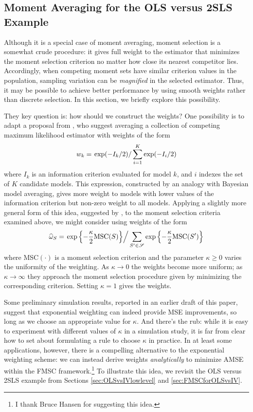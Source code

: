 \subsection{Moment Averaging for the OLS versus 2SLS Example}
Although it is a special case of moment averaging, moment selection is a somewhat crude procedure: it gives full weight to the estimator that minimizes the moment selection criterion no matter how close its nearest competitor lies. 
Accordingly, when competing moment sets have similar criterion values in the population, sampling variation can be \emph{magnified} in the selected estimator. 
Thus, it may be possible to achieve better performance by using smooth weights rather than discrete selection.
In this section, we briefly explore this possibility.

They key question is: how should we construct the weights?
One possibility is to adapt a proposal from \cite{Burnhametal}, who suggest averaging a collection of competing maximum likelihood estimator with weights of the form 
\[w_k =\left. \exp(-I_k/2)\right/\sum_{i=1}^K \exp(-I_i/2)\] 
where $I_k$ is an information criterion evaluated for model $k$, and $i$ indexes the set of $K$ candidate models. 
This expression, constructed by an analogy with Bayesian model averaging, gives more weight to models with lower values of the information criterion but non-zero weight to all models. 
Applying a slightly more general form of this idea, suggested by \cite{ClaeskensHjortbook}, to the moment selection criteria examined above, we might consider using weights of the form	
\[		\widehat{\omega}_S = \left.\exp\left\{-\frac{\kappa}{2} \mbox{MSC}(S)\right\}\right/\sum_{S' \in \mathscr{S}}\exp\left\{-\frac{\kappa}{2} \mbox{MSC}(S')\right\}\]
where MSC$(\cdot)$ is a moment selection criterion and the parameter $\kappa \geq 0$ varies the uniformity of the weighting. 
As $\kappa \rightarrow 0$ the weights become more uniform; as $\kappa \rightarrow \infty$ they approach the moment selection procedure given by minimizing the corresponding criterion. 
Setting $\kappa = 1$ gives the \cite{Burnhametal} weights.

Some preliminary simulation results, reported in an earlier draft of this paper, suggest that exponential weighting can indeed provide MSE improvements, so long as we choose an appropriate value for $\kappa$.
And there's the rub: while it is easy to experiment with different values of $\kappa$ in a simulation study, it is far from clear how to set about formulating a rule to choose $\kappa$ in practice. In at least some applications, however, there is a compelling alternative to the exponential weighting scheme: we can instead derive weights \emph{analytically} to minimize AMSE within the FMSC framework.\footnote{I thank Bruce Hansen for suggesting this idea.} 
To illustrate this idea, we revisit the OLS versus 2SLS example from Sections \ref{sec:OLSvsIVlowlevel} and \ref{sec:FMSCforOLSvsIV}. 

